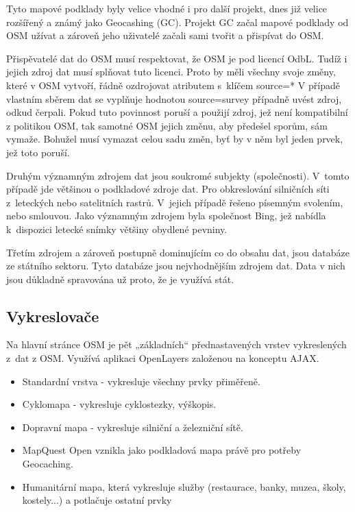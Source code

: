 Tyto mapové podklady byly velice vhodné i pro další projekt, dnes již 
velice rozšířený a známý jako Geocashing (GC). Projekt GC začal mapové 
podklady od OSM užívat a zároveň jeho uživatelé začali sami tvořit a 
přispívat do OSM. 

Přispěvatelé dat do OSM musí respektovat, že OSM je pod licencí OdbL. 
Tudíž i jejich zdroj dat musí splňovat tuto licenci. Proto by měli 
všechny svoje změny, které v OSM vytvoří, řádně ozdrojovat atributem 
s~klíčem 
source=*
V případě vlastním sběrem dat se vyplňuje hodnotou 
source=survey
případně uvést zdroj, odkud čerpali. Pokud tuto povinnost poruší a 
použijí zdroj, jež není kompatibilní z politikou OSM, tak samotné OSM 
jejich změnu, aby předešel sporům, sám vymaže. Bohužel musí vymazat 
celou sadu změn, byť by v něm byl jeden prvek, jež toto poruší. 

Druhým významným zdrojem dat jsou soukromé subjekty (společnosti). 
V~tomto případě jde většinou o podkladové zdroje dat. Pro obkreslování 
silničních síti z~leteckých nebo satelitních rastrů. V~jejich případě 
řešeno písemným svolením, nebo smlouvou. Jako významným zdrojem byla 
společnost Bing, jež nabídla k~dispozici letecké snímky většiny 
obydlené pevniny. 

Třetím zdrojem a zároveň postupně dominujícím co do obsahu dat, jsou 
databáze ze státního sektoru. Tyto databáze jsou nejvhodnějším zdrojem 
dat. Data v nich jsou důkladně spravována už proto, že je využívá stát. 

\subsection{Vykreslovače}
\label{vykreslovače}
Na hlavní stránce OSM je pět „základních“ přednastavených vrstev vykreslených 
z~dat z OSM. Využívá aplikaci OpenLayers založenou na konceptu AJAX.

\begin{itemize}

  \item Standardní vrstva - vykresluje všechny prvky přiměřeně.
  \item Cyklomapa - vykresluje cyklostezky, výškopis. 
  \item Dopravní mapa - vykresluje silniční a železniční sítě.
  \item MapQuest Open vznikla jako podkladová mapa právě pro potřeby 
Geocaching.
  \item Humanitární mapa, která vykresluje služby (restaurace, banky, muzea, 
  školy, kostely...)  a potlačuje ostatní prvky 

\end{itemize}

